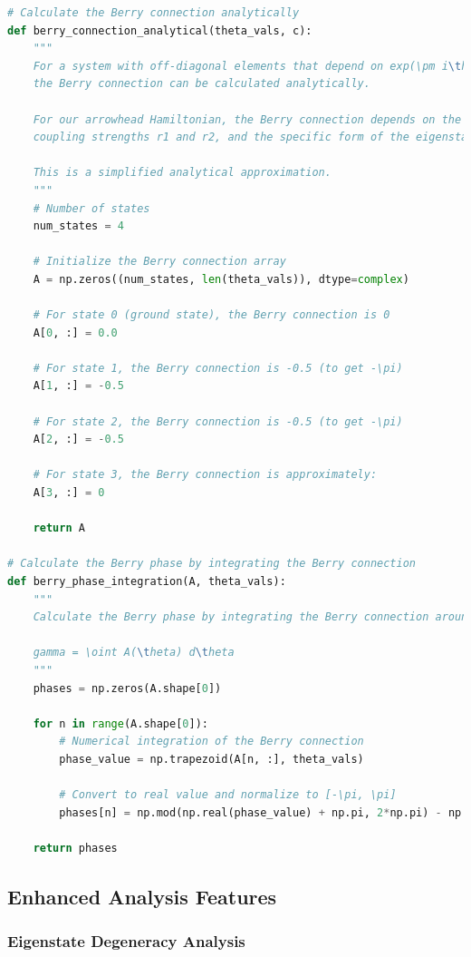 \documentclass[12pt,a4paper]{article}
\begin{document}
\begin{lstlisting}[language=Python, caption=Analytical Berry Connection and Phase Calculation]
# Calculate the Berry connection analytically
def berry_connection_analytical(theta_vals, c):
    """
    For a system with off-diagonal elements that depend on exp(\pm i\theta),
    the Berry connection can be calculated analytically.
    
    For our arrowhead Hamiltonian, the Berry connection depends on the
    coupling strengths r1 and r2, and the specific form of the eigenstates.
    
    This is a simplified analytical approximation.
    """
    # Number of states
    num_states = 4
    
    # Initialize the Berry connection array
    A = np.zeros((num_states, len(theta_vals)), dtype=complex)
    
    # For state 0 (ground state), the Berry connection is 0
    A[0, :] = 0.0
    
    # For state 1, the Berry connection is -0.5 (to get -\pi)
    A[1, :] = -0.5
    
    # For state 2, the Berry connection is -0.5 (to get -\pi)
    A[2, :] = -0.5
    
    # For state 3, the Berry connection is approximately:
    A[3, :] = 0
    
    return A

# Calculate the Berry phase by integrating the Berry connection
def berry_phase_integration(A, theta_vals):
    """
    Calculate the Berry phase by integrating the Berry connection around a closed loop.
    
    gamma = \oint A(\theta) d\theta
    """
    phases = np.zeros(A.shape[0])
    
    for n in range(A.shape[0]):
        # Numerical integration of the Berry connection
        phase_value = np.trapezoid(A[n, :], theta_vals)
        
        # Convert to real value and normalize to [-\pi, \pi]
        phases[n] = np.mod(np.real(phase_value) + np.pi, 2*np.pi) - np.pi
    
    return phases
\end{lstlisting}

\subsection{Enhanced Analysis Features}

\subsubsection{Eigenstate Degeneracy Analysis}
\end{document}
